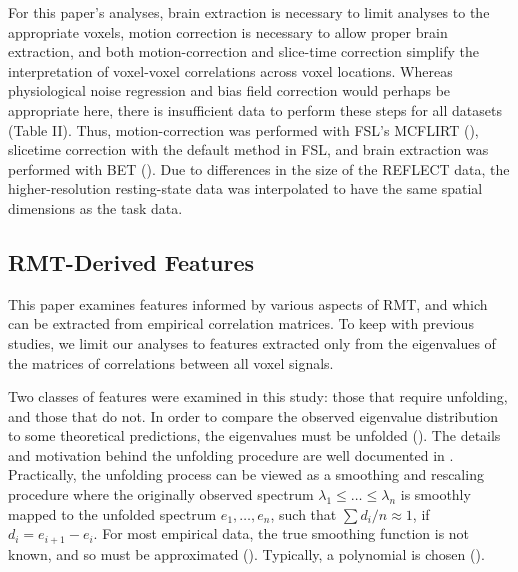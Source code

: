 For this paper’s analyses, brain extraction is necessary to limit analyses to the appropriate
voxels, motion correction is necessary to allow proper brain extraction, and both motion-correction
and slice-time correction simplify the interpretation of voxel-voxel correlations across voxel
locations. Whereas physiological noise regression and bias field correction would perhaps be
appropriate here, there is insufficient data to perform these steps for all datasets (Table II).
Thus, motion-correction was performed with FSL's MCFLIRT
(\cite{jenkinsonImprovedOptimizationRobust2002}), slicetime correction with the default method in
FSL, and brain extraction was performed with BET (\cite{smithFastRobustAutomated2002}). Due to
differences in the size of the REFLECT data, the higher-resolution resting-state data was
interpolated to have the same spatial dimensions as the task data.

\subsection{RMT-Derived Features}
This paper examines features informed by various aspects of RMT, and which can be extracted from
empirical correlation matrices. To keep with previous studies, we limit our analyses to features
extracted only from the eigenvalues of the matrices of correlations between all voxel signals.

Two classes of features were examined in this study: those that require unfolding, and those that do
not. In order to compare the observed eigenvalue distribution to some theoretical predictions, the
eigenvalues must be unfolded (\cite{guhrRandommatrixTheoriesQuantum1998a,mehtaRandomMatrices2004}).
The details and motivation behind the unfolding procedure are well documented in
\cite{guhrRandommatrixTheoriesQuantum1998a}. Practically, the unfolding process can be viewed as a
smoothing and rescaling procedure where the originally observed spectrum \(\lambda_1 \le \dots \le
\lambda_n\) is smoothly mapped to the unfolded spectrum \(e_1, \dots, e_n\), such that \(\sum d_i/n
\approx 1\), if \(d_i = e_{i+1} - e_i \). For most empirical data, the true smoothing function is
not known, and so must be approximated
(\cite{guhrRandommatrixTheoriesQuantum1998a,mehtaRandomMatrices2004}). Typically, a polynomial is
chosen (\cite{abul-magdUnfoldingSpectrumChaotic2014}).

